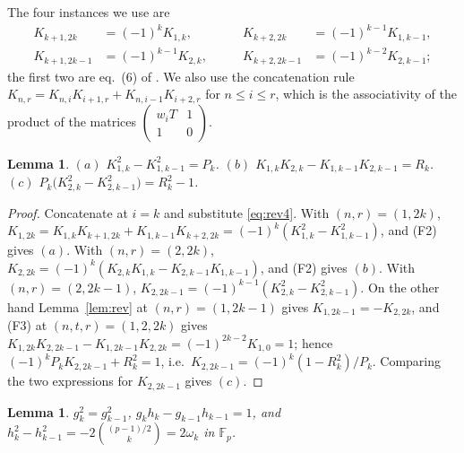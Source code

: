 \documentclass[11pt]{amsart}
\newtheorem{lemma}[theorem]{Lemma}
\theoremstyle{remark}
\newcommand{\Fp}{\mathbb F_p}
\newcommand{\Kc}[2]{K_{#1,#2}}
\begin{document}
The four instances we use are
\begin{equation}\label{eq:rev4}
\begin{aligned}
 \Kc{k+1}{2k}&=(-1)^k\Kc1k, &\qquad \Kc{k+2}{2k}&=(-1)^{k-1}\Kc1{k-1},\\
 \Kc{k+1}{2k-1}&=(-1)^{k-1}\Kc2k, &\qquad \Kc{k+2}{2k-1}&=(-1)^{k-2}\Kc2{k-1};
\end{aligned}
\end{equation}
the first two are eq.~(6) of \cite{L}. We also use the concatenation rule
$\Kc nr=\Kc ni\Kc{i+1}r+\Kc n{i-1}\Kc{i+2}r$ for $n\le i\le r$, which is the associativity of the
product of the matrices $\begin{pmatrix}w_iT&1\\1&0\end{pmatrix}$.

\begin{lemma}\label{lem:three}
$(a)$ $\Kc1k^2-\Kc1{k-1}^2=P_k$. \quad
$(b)$ $\Kc1k\Kc2k-\Kc1{k-1}\Kc2{k-1}=R_k$. \quad
$(c)$ $P_k\bigl(\Kc2k^2-\Kc2{k-1}^2\bigr)=R_k^2-1$.
\end{lemma}

\begin{proof}
Concatenate at $i=k$ and substitute \eqref{eq:rev4}. With $(n,r)=(1,2k)$,
$\Kc1{2k}=\Kc1k\Kc{k+1}{2k}+\Kc1{k-1}\Kc{k+2}{2k}=(-1)^k(\Kc1k^2-\Kc1{k-1}^2)$, and (F2) gives
$(a)$. With $(n,r)=(2,2k)$, $\Kc2{2k}=(-1)^k(\Kc2k\Kc1k-\Kc2{k-1}\Kc1{k-1})$, and (F2) gives $(b)$.
With $(n,r)=(2,2k-1)$, $\Kc2{2k-1}=(-1)^{k-1}(\Kc2k^2-\Kc2{k-1}^2)$. On the other hand
Lemma~\ref{lem:rev} at $(n,r)=(1,2k-1)$ gives $\Kc1{2k-1}=-\Kc2{2k}$, and (F3) at
$(n,t,r)=(1,2,2k)$ gives $\Kc1{2k}\Kc2{2k-1}-\Kc1{2k-1}\Kc2{2k}=(-1)^{2k-2}\Kc1{0}=1$; hence
$(-1)^kP_k\Kc2{2k-1}+R_k^2=1$, i.e.\ $\Kc2{2k-1}=(-1)^k(1-R_k^2)/P_k$. Comparing the two
expressions for $\Kc2{2k-1}$ gives $(c)$.
\end{proof}

\begin{lemma}\label{lem:T1}
$g_k^2=g_{k-1}^2$, \quad $g_kh_k-g_{k-1}h_{k-1}=1$, \quad and
$h_k^2-h_{k-1}^2=-2\binom{(p-1)/2}{k}=2\omega_k$ in $\Fp$.
\end{lemma}
\end{document}
